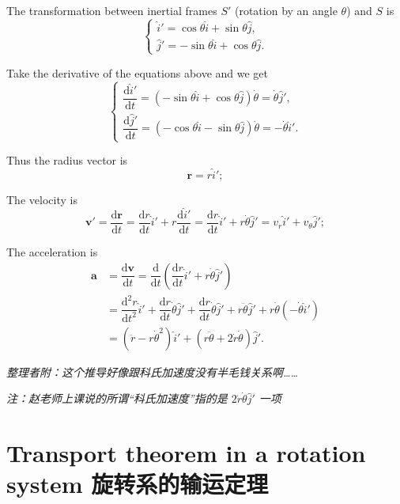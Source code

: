 The transformation between inertial frames \(S'\) (rotation by an angle
\(\theta\)) and \(S\) is \[\left\{
    \begin{array}{l}
        \hat i' = \cos \theta \hat i + \sin \theta \hat j, \\
        \hat j' = - \sin \theta \hat i + \cos \theta \hat j.
    \end{array}
\right.\]

Take the derivative of the equations above and we get \[\left\{
    \begin{array}{l}
        \dfrac{\mathrm d \hat i'}{\mathrm d t} = (- \sin \theta \hat i + \cos \theta \hat j) \dot \theta = \dot \theta \hat j', \\
        \dfrac{\mathrm d \hat j'}{\mathrm d t} = (- \cos \theta \hat i - \sin \theta \hat j) \dot \theta = - \dot \theta \hat i'.
    \end{array}
\right.\]

Thus the radius vector is \[\boldsymbol r = r \hat i';\]

The velocity is
\[\boldsymbol v' = \dfrac{\mathrm d \boldsymbol r}{\mathrm dt} = \dfrac{\mathrm dr}{\mathrm dt} \hat i' + r \dfrac{\mathrm d \hat i'}{\mathrm dt} = \dfrac{\mathrm dr}{\mathrm dt} \hat i' + r \dot \theta \hat j' = v_r \hat i' + v_\theta \hat j';\]

The acceleration is \begin{align*}
    \boldsymbol a & = \dfrac{\mathrm d \boldsymbol v}{\mathrm dt} = \dfrac{\mathrm d}{\mathrm dt} \left( \dfrac{\mathrm dr}{\mathrm dt} \hat i' + r \dot \theta \hat j' \right) \\
    & = \dfrac{\mathrm d^2 r}{\mathrm dt^2} \hat i' + \dfrac{\mathrm dr}{\mathrm dt} \dot \theta \hat j' + \dfrac{\mathrm dr}{\mathrm dt} \dot \theta \hat j' +  r \ddot \theta \hat j' +  r \dot \theta (- \dot \theta \hat i') \\
    & = (\ddot r - r \dot \theta^2) \hat i' + (r \ddot  \theta + 2 \dot r \dot \theta) \hat j'.
\end{align*}

\emph{整理者附：这个推导好像跟科氏加速度没有半毛钱关系啊\ldots\ldots{}}

\emph{注：赵老师上课说的所谓``科氏加速度''指的是
\(2 \dot r \dot \theta \hat j'\) 一项}

\section{Transport theorem in a rotation system
旋转系的输运定理}\label{transport-theorem-in-a-rotation-system-ux65cbux8f6cux7cfbux7684ux8f93ux8fd0ux5b9aux7406}

